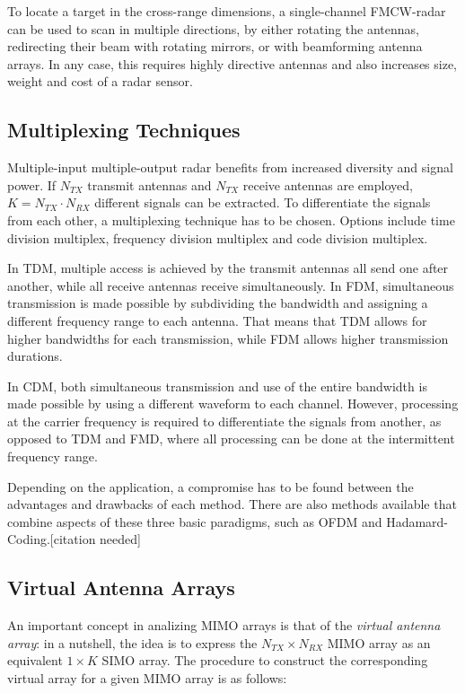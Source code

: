 To locate a target in the cross-range dimensions,
a single-channel FMCW-radar can be used to scan in multiple directions,
by either rotating the antennas, redirecting their beam with rotating mirrors, or with beamforming antenna arrays.
In any case, this requires highly directive antennas and also increases size, weight and cost of a radar sensor.

\subsection{Multiplexing Techniques}
Multiple-input multiple-output radar benefits from increased diversity and signal power.
If $N_{TX}$ transmit antennas and $N_{TX}$ receive antennas are employed, $K=N_{TX} \cdot N_{RX}$ different signals can be extracted.
To differentiate the signals from each other, a multiplexing technique has to be chosen.
Options include time division multiplex, frequency division multiplex and code division multiplex.

In TDM, multiple access is achieved by the transmit antennas all send one after another,
while all receive antennas receive simultaneously.
In FDM, simultaneous transmission is made possible by subdividing the bandwidth and assigning a different frequency range to each antenna.
That means that TDM allows for higher bandwidths for each transmission, while FDM allows higher transmission durations.

In CDM, both simultaneous transmission and use of the entire bandwidth is made possible by using a different waveform to each channel.
However, processing at the carrier frequency is required to differentiate the signals from another, as opposed to TDM and FMD,
where all processing can be done at the intermittent frequency range.

Depending on the application, a compromise has to be found between the advantages and drawbacks of each method.
There are also methods available that combine aspects of these three basic paradigms, such as OFDM and Hadamard-Coding.[citation needed] \\

\subsection{Virtual Antenna Arrays}
An important concept in analizing MIMO arrays is that of the \emph{virtual antenna array}:
in a nutshell, the idea is to express the $N_{TX} \times N_{RX}$ MIMO array as an equivalent $1\times K$ SIMO array.
The procedure to construct the corresponding virtual array for a given MIMO array is as follows:

